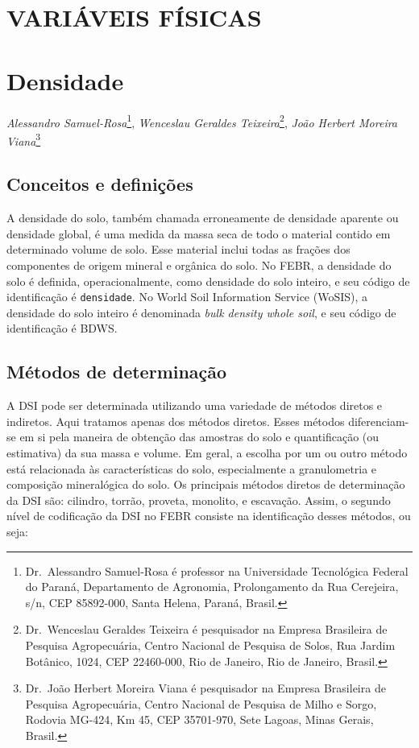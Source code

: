 \documentclass[a4paper,dvipsnames]{tufte-book}
\begin{document}
\section*{VARIÁVEIS FÍSICAS}\label{variuxe1veis-fuxedsicas}

\section{Densidade}\label{densidade}

\emph{Alessandro Samuel-Rosa}\footnote{Dr.~Alessandro Samuel-Rosa é
  professor na Universidade Tecnológica Federal do Paraná, Departamento
  de Agronomia, Prolongamento da Rua Cerejeira, s/n, CEP 85892-000,
  Santa Helena, Paraná, Brasil.}, \emph{Wenceslau Geraldes
Teixeira}\footnote{Dr.~Wenceslau Geraldes Teixeira é pesquisador na
  Empresa Brasileira de Pesquisa Agropecuária, Centro Nacional de
  Pesquisa de Solos, Rua Jardim Botânico, 1024, CEP 22460-000, Rio de
  Janeiro, Rio de Janeiro, Brasil.}, \emph{João Herbert Moreira
Viana}\footnote{Dr.~João Herbert Moreira Viana é pesquisador na Empresa
  Brasileira de Pesquisa Agropecuária, Centro Nacional de Pesquisa de
  Milho e Sorgo, Rodovia MG-424, Km 45, CEP 35701-970, Sete Lagoas,
  Minas Gerais, Brasil.}

\subsection{Conceitos e
definições}\label{conceitos-e-definiuxe7uxf5es-2}

A densidade do solo, também chamada erroneamente de densidade aparente
ou densidade global, é uma medida da massa seca de todo o material
contido em determinado volume de solo. Esse material inclui todas as
frações dos componentes de origem mineral e orgânica do solo. No FEBR, a
densidade do solo é definida, operacionalmente, como densidade do solo
inteiro, e seu código de identificação é \texttt{densidade}. No World
Soil Information Service (WoSIS), a densidade do solo inteiro é
denominada \emph{bulk density whole soil}, e seu código de identificação
é BDWS.

\subsection{Métodos de
determinação}\label{muxe9todos-de-determinauxe7uxe3o-1}

A DSI pode ser determinada utilizando uma variedade de métodos diretos e
indiretos. Aqui tratamos apenas dos métodos diretos. Esses métodos
diferenciam-se em si pela maneira de obtenção das amostras do solo e
quantificação (ou estimativa) da sua massa e volume. Em geral, a escolha
por um ou outro método está relacionada às características do solo,
especialmente a granulometria e composição mineralógica do solo. Os
principais métodos diretos de determinação da DSI são: cilindro, torrão,
proveta, monolito, e escavação. Assim, o segundo nível de codificação da
DSI no FEBR consiste na identificação desses métodos, ou seja:
\end{document}
